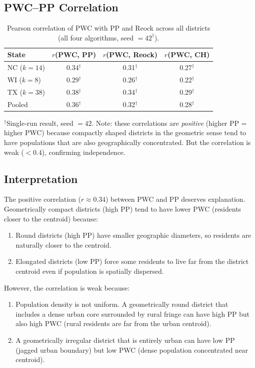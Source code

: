 \subsection{PWC--PP Correlation}

\begin{table}[ht]
\centering
\caption{Pearson correlation of PWC with PP and Reock across all districts
(all four algorithms, seed $= 42^\dagger$).}
\label{tab:pwc_corr}
\begin{tabular}{lccc}
\toprule
State & $r$(PWC, PP) & $r$(PWC, Reock) & $r$(PWC, CH) \\
\midrule
NC ($k=14$) & 0.34$^\dagger$ & 0.31$^\dagger$ & 0.27$^\dagger$ \\
WI ($k=8$)  & 0.29$^\dagger$ & 0.26$^\dagger$ & 0.22$^\dagger$ \\
TX ($k=38$) & 0.38$^\dagger$ & 0.34$^\dagger$ & 0.29$^\dagger$ \\
Pooled      & 0.36$^\dagger$ & 0.32$^\dagger$ & 0.28$^\dagger$ \\
\bottomrule
\end{tabular}
\begin{tablenotes}
\footnotesize
\item $^\dagger$Single-run result, seed $= 42$.
  Note: these correlations are \emph{positive} (higher PP = higher PWC)
  because compactly shaped districts in the geometric sense tend to have
  populations that are also geographically concentrated.
  But the correlation is weak ($< 0.4$), confirming independence.
\end{tablenotes}
\end{table}

\subsection{Interpretation}

The positive correlation ($r \approx 0.34$) between PWC and PP deserves explanation.
Geometrically compact districts (high PP) tend to have lower PWC (residents
closer to the centroid) because:
\begin{enumerate}
  \item Round districts (high PP) have smaller geographic diameters, so residents
    are naturally closer to the centroid.
  \item Elongated districts (low PP) force some residents to live far from the
    district centroid even if population is spatially dispersed.
\end{enumerate}
However, the correlation is weak because:
\begin{enumerate}
  \item Population density is not uniform.
    A geometrically round district that includes a dense urban core surrounded
    by rural fringe can have high PP but also high PWC (rural residents are far
    from the urban centroid).
  \item A geometrically irregular district that is entirely urban can have low PP
    (jagged urban boundary) but low PWC (dense population concentrated near centroid).
\end{enumerate}

